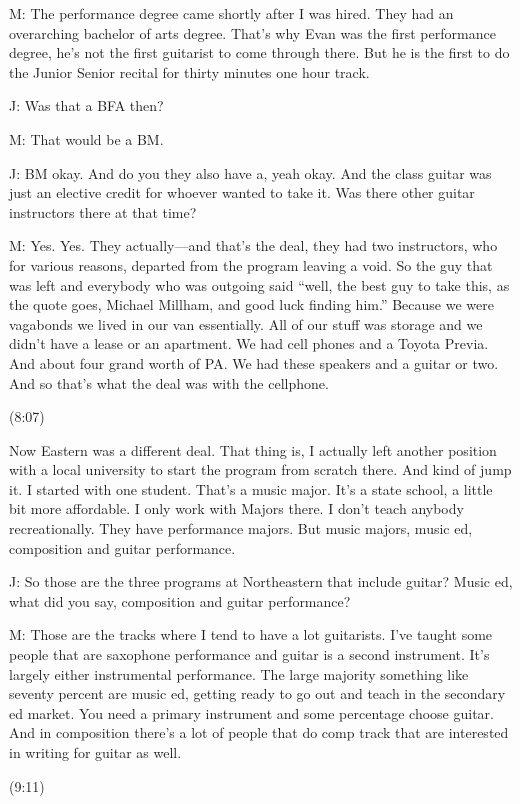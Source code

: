 \documentclass[11pt]{article}
\begin{document}
M: The performance degree came shortly after I was hired. They had an overarching bachelor of arts degree. That's why Evan was the first performance degree, he's not the first guitarist to come through there. But he is the first to do the Junior Senior recital for thirty minutes one hour track. 

J: Was that a BFA then?

M: That would be a BM.

J: BM okay. And do you they also have a, yeah okay. And the class guitar was just an elective credit for whoever wanted to take it. Was there other guitar instructors there at that time? 

M: Yes. Yes. They actually—and that's the deal, they had two instructors, who for various reasons, departed from the program leaving a void. So the guy that was left and everybody who was outgoing said ``well, the best guy to take this, as the quote goes, Michael Millham, and good luck finding him.'' Because we were vagabonds we lived in our van essentially. All of our stuff was storage and we didn't have a lease or an apartment. We had cell phones and a Toyota Previa. And about four grand worth of PA. We had these speakers and a guitar or two. And so that's what the deal was with the cellphone.

(8:07)

Now Eastern was a different deal. That thing is, I actually left another position with a local university to start the program from scratch there. And kind of jump it. I started with one student. That's a music major. It's a state school, a little bit more affordable. I only work with Majors there. I don't teach anybody recreationally. They have performance majors. But music majors, music ed, composition and guitar performance.  

J: So those are the three programs at Northeastern that include guitar? Music ed, what did you say, composition and guitar performance?

M: Those are the tracks where I tend to have a lot guitarists. I've taught some people that are saxophone performance and guitar is a second instrument. It's largely either instrumental performance. The large majority something like seventy percent are music ed, getting ready to go out and teach in the secondary ed market. You need a primary instrument and some percentage choose guitar. And in composition there's a lot of people that do comp track that are interested in writing for guitar as well.

(9:11)
\end{document}
